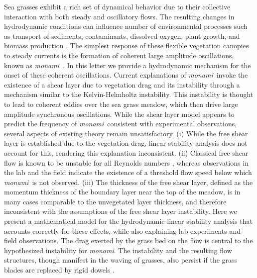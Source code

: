 \documentclass[aps,prl,twocolumn,superscriptaddress,10pt]{revtex4-1}  %
\newcommand{\monami}{\textit{monami}}
\begin{document}
\maketitle
Sea grasses exhibit a rich set of dynamical behavior due to their collective interaction with both steady and oscillatory flows.  
The resulting changes in hydrodynamic conditions can influence number of environmental processes such as transport of sediments, contaminants, dissolved oxygen, plant growth, and biomass production  \cite{Fonseca87,Grizzle96,Nepf99,Nepf2012}. 
The simplest response of these flexible vegetation canopies to steady currents is the formation of coherent large amplitude oscillations, known as \monami ~\cite{AckermanOkubo93}.  
In this letter we provide a hydrodynamic mechanism for the onset of these coherent oscillations.
\newline
Current explanations of \monami ~invoke the existence of a shear layer due to vegetation drag  \cite{Ghisal02,Raupach96} and its instability through a mechanism similar to the Kelvin-Helmholtz instability. 
This instability is thought to lead to coherent eddies over the sea grass meadow, which then drive large amplitude synchronous oscillations.
\newline
While the shear layer model appears to predict the frequency of \monami ~consistent with experimental observations, several aspects of existing theory remain unsatisfactory. 
(i) While the free shear layer is established due to the vegetation drag, linear stability analysis \cite{Raupach96,White07} does not account for this, rendering this explanation inconsistent. 
(ii) Classical free shear flow is known to be unstable for all Reynolds numbers \cite{drazin}, whereas observations in the lab \cite{Ghisal02} and the field \cite{Grizzle96} indicate the existence of a threshold flow speed below which \monami ~is not observed. 
(iii) The thickness of the free shear layer, defined as the momentum thickness of the boundary layer near the top of the meadow, is in many cases comparable to the unvegetated layer thickness, and therefore inconsistent with the assumptions of the free shear layer instability.
Here we present a mathematical model for the hydrodynamic linear stability analysis that accounts correctly for these effects, while also explaining lab experiments and field observations.
\newline
The drag exerted by the grass bed on the flow is central to the hypothesized instability for \monami. 
The instability and the resulting flow structures, though manifest in the waving of grasses, also persist if the grass blades are replaced by rigid dowels \cite{Ghisal02}. 
\end{document}
